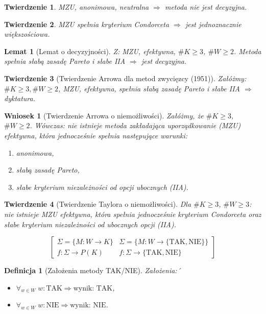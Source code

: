 \documentclass[12pt,a4paper]{article}
\theoremstyle{break}
\newtheorem{definition}{Definicja}[section]
\newtheorem{theorem}{Twierdzenie}[section]
\newtheorem{lemma}{Lemat}[section]
\newtheorem{wniosek}{Wniosek}[theorem]
\begin{document}
	\begin{theorem}
		MZU, anonimowa, neutralna $\Rightarrow$ metoda nie jest decyzyjna.
	\end{theorem}

	\begin{theorem}
		MZU spełnia kryterium Condorceta $\Rightarrow$ jest jednoznacznie większościowa.
	\end{theorem}

	\begin{lemma}[Lemat o decyzyjności]
		Z: MZU, efektywna, $\#K\geq3$, $\#W\geq2$.
		Metoda spełnia słabą zasadę Pareto i słabe IIA
		$\Rightarrow$ jest decyzyjna.
	\end{lemma} 

	\begin{theorem}[Twierdzenie Arrowa dla metod zwycięzcy (1951)]
		Załóżmy: $\# K \geq 3, \#W\geq2$, MZU, efektywna, spełnia słabą zasadę Pareto i słabe IIA $\Rightarrow$ dyktatura.
	\end{theorem}

	\begin{wniosek}[Twierdzenie Arrowa o niemożliwości]
		Załóżmy, że $\# K \geq 3$, $\# W \geq 2$. Wówczas: nie istnieje metoda zakładająca uporządkowanie (MZU) efektywna, która jednocześnie spełnia następujące warunki:
		\begin{enumerate}[-]
			\item anonimowa,
			\item słabą zasadę Pareto,
			\item słabe kryterium niezależności od opcji ubocznych (IIA).
		\end{enumerate}
	\end{wniosek}

	\begin{theorem}[Twierdzenie Taylora o niemożliwości]
		Dla $\# K \geq 3$, $\# W \geq 3$:  
		nie istnieje MZU efektywna, która spełnia jednocześnie kryterium Condorceta oraz słabe kryterium niezależności od ubocznych opcji (IIA).
	\end{theorem}

	$$
	\begin{bmatrix}
		\Sigma = \{ M: W \rightarrow K \} & \Sigma = \{ M: W \rightarrow \{ \text{TAK}, \text{NIE} \} \} \\
		f:\Sigma \rightarrow P(K) & f:\Sigma \rightarrow \{ \text{TAK}, \text{NIE} \}
	\end{bmatrix}
	$$
	
	\begin{definition}[Założenia metody TAK/NIE]
		Założenia:´
		
		\begin{itemize}
			\item $\forall_{w \in W} \; w : \text{TAK} \Rightarrow \text{wynik: TAK}$,
			\item $\forall_{w \in W} \; w : \text{NIE} \Rightarrow \text{wynik: NIE}$.
		\end{itemize}
	\end{definition}
\end{document}
